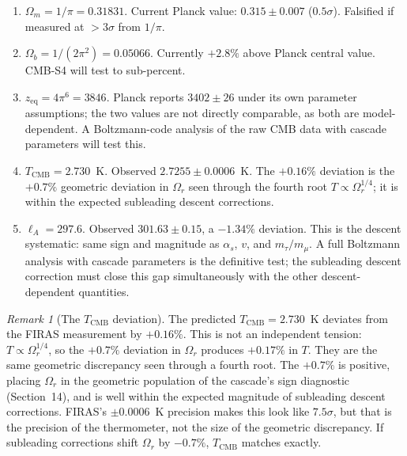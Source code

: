 \documentclass[12pt,a4paper]{article}
\theoremstyle{remark}
\newtheorem*{remark}{Remark}
\begin{document}
\begin{enumerate}[nosep]
\item $\Omega_m = 1/\pi = 0.31831$. Current Planck value: $0.315 \pm 0.007$ ($0.5\sigma$). Falsified if measured at $> 3\sigma$ from $1/\pi$.
\item $\Omega_b = 1/(2\pi^2) = 0.05066$. Currently $+2.8\%$ above Planck central value. CMB-S4 will test to sub-percent.
\item $z_{\mathrm{eq}} = 4\pi^6 = 3846$. Planck reports $3402 \pm 26$ under its own parameter assumptions; the two values are not directly comparable, as both are model-dependent. A Boltzmann-code analysis of the raw CMB data with cascade parameters will test this.
\item $T_{\mathrm{CMB}} = 2.730$~K. Observed $2.7255 \pm 0.0006$~K. The $+0.16\%$ deviation is the $+0.7\%$ geometric deviation in $\Omega_r$ seen through the fourth root $T \propto \Omega_r^{1/4}$; it is within the expected subleading descent corrections.
\item $\ell_A = 297.6$. Observed $301.63 \pm 0.15$, a $-1.34\%$ deviation. This is the descent systematic: same sign and magnitude as $\alpha_s$, $v$, and $m_\tau/m_\mu$. A full Boltzmann analysis with cascade parameters is the definitive test; the subleading descent correction must close this gap simultaneously with the other descent-dependent quantities.
\end{enumerate}

\begin{remark}[The $T_{\mathrm{CMB}}$ deviation]
The predicted $T_{\mathrm{CMB}} = 2.730$~K deviates from the FIRAS measurement by $+0.16\%$. This is not an independent tension: $T \propto \Omega_r^{1/4}$, so the $+0.7\%$ deviation in $\Omega_r$ produces $+0.17\%$ in $T$. They are the same geometric discrepancy seen through a fourth root. The $+0.7\%$ is positive, placing $\Omega_r$ in the geometric population of the cascade's sign diagnostic (Section~14), and is well within the expected magnitude of subleading descent corrections. FIRAS's $\pm 0.0006$~K precision makes this look like $7.5\sigma$, but that is the precision of the thermometer, not the size of the geometric discrepancy. If subleading corrections shift $\Omega_r$ by $-0.7\%$, $T_{\mathrm{CMB}}$ matches exactly.
\end{remark}
\end{document}
